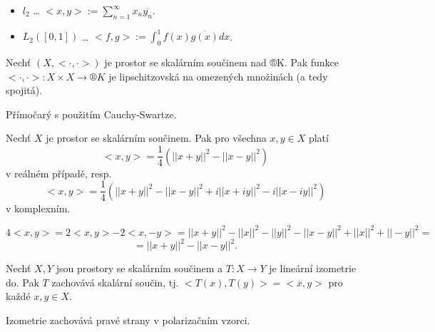 \documentclass[12pt]{article}					%
\begin{document}
\begin{priklady}
	\begin{itemize}
		\item $l_2$ … $<x, y> := \sum_{n=1}^∞ x_n \overline{y_n}$.
		\item $L_2([0, 1])$ … $<f, g> := \int_0^1 f(x) \overline{g(x)} dx$.
	\end{itemize}
\end{priklady}

\begin{tvrzeni}
	Nechť $(X, <·, ·>)$ je prostor se skalárním součinem nad ®K. Pak funkce $<·, ·>: X \times X \rightarrow ®K$ je lipschitzovská na omezených množinách (a tedy spojitá).

	\begin{dukazin}
		Přímočarý s použitím Cauchy-Swartze.
	\end{dukazin}
\end{tvrzeni}

\begin{tvrzeni}
	Nechť $X$ je prostor se skalárním součinem. Pak pro všechna $x, y \in X$ platí
	$$ <x, y> = \frac{1}{4}(||x + y||^2 - ||x - y||^2) $$
	v reálném případě, resp.
	$$ <x, y> = \frac{1}{4}(||x + y||^2 - ||x - y||^2 + i||x + iy||^2 - i||x - iy||^2) $$
	v komplexním.

	\begin{dukazin}
		$$ 4<x, y> = 2<x, y> - 2<x, -y> = ||x + y||^2 - ||x||^2 - ||y||^2 - ||x - y||^2 + ||x||^2 + ||-y||^2 = $$
		$$ = ||x + y||^2 - ||x - y||^2. $$	
	\end{dukazin}
\end{tvrzeni}

\begin{dusledek}
	Nechť $X, Y$ jsou prostory se skalárním součinem a $T: X \rightarrow Y$ je lineární izometrie do. Pak $T$ zachovává skalární součin, tj. $<T(x), T(y)> = <x, y>$ pro každé $x, y \in X$.

	\begin{dukazin}
		Izometrie zachovává pravé strany v polarizačním vzorci.
	\end{dukazin}
\end{dusledek}

\end{document}

